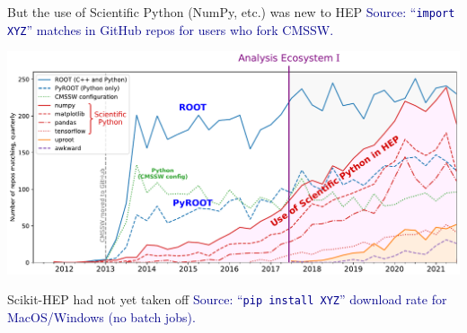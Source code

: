 \documentclass[aspectratio=169]{beamer}
\begin{document}
\begin{frame}{But the use of Scientific Python (NumPy, etc.) was new to HEP}
\vspace{0.25 cm}
\textcolor{darkblue}{Source: ``\texttt{import XYZ}'' matches in GitHub repos for users who fork CMSSW.}

\includegraphics[width=\linewidth]{PLOTS/gihub-package-fullstudy-for-review.pdf}
\end{frame}

\begin{frame}{Scikit-HEP had not yet taken off}
\vspace{0.25 cm}
\textcolor{darkblue}{Source: ``\texttt{pip install XYZ}'' download rate for MacOS/Windows (no batch jobs).}

\vspace{0.1 cm}
\end{frame}
\end{document}
